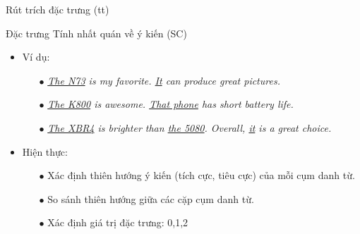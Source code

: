 \documentclass[9pt,xcolor=table,hyperref=unicode]{beamer}
\begin{document}
	\begin{frame}{Rút trích đặc trưng (tt)}
		\begin{block}{Đặc trưng Tính nhất quán về ý kiến (SC)}		
			\begin{itemize}				
				\item{Ví dụ:\\
					\begin{itemize}	
						\itemsep0.8em			
						\item[$\bullet$]{\textit{\underline{The N73} is my favorite. \underline{It} can produce great pictures.}}
						\item[$\bullet$]{\textit{\underline{The K800} is awesome. \underline{That phone} has short battery life.}}
						\item[$\bullet$]{\textit{\underline{The XBR4} is brighter than \underline{the 5080}. Overall, \underline{it} is a great choice.}}
					\end{itemize}
				}
				\item{Hiện thực: \\
					\begin{itemize}
						\itemsep0.8em
						\item[$\bullet$]{Xác định thiên hướng ý kiến (tích cực, tiêu cực) của mỗi cụm danh từ.}
						\item[$\bullet$]{So sánh thiên hướng giữa các cặp cụm danh từ.}
						\item[$\bullet$]{Xác định giá trị đặc trưng: 0,1,2}
					\end{itemize}
				}
			\end{itemize}									
		\end{block}	
				
	\end{frame}	
\end{document}
